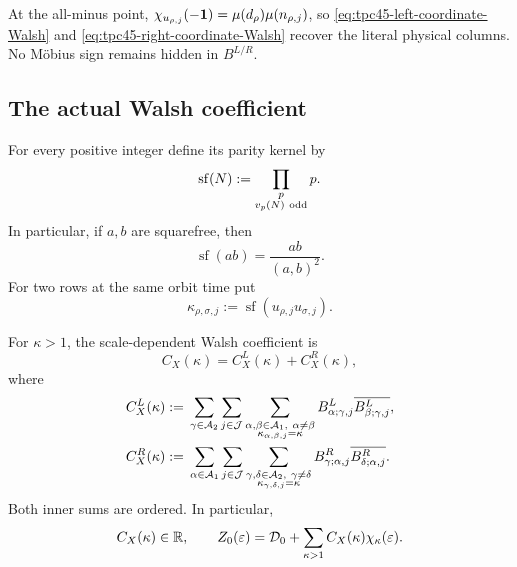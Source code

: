 At the all-minus point,
\(\chi_{u_{\rho,j}}(-\mathbf 1)=\mu(d_\rho)\mu(n_{\rho,j})\), so
\eqref{eq:tpc45-left-coordinate-Walsh} and
\eqref{eq:tpc45-right-coordinate-Walsh} recover the literal physical
columns.  No M\"obius sign remains hidden in \(B^{L/R}\).

\subsection{The actual Walsh coefficient}

For every positive integer define its parity kernel by
\begin{equation}
 \operatorname{sf}(N)
 :=\prod_{\substack{p\\v_p(N)\ {\rm odd}}}p.
 \label{eq:tpc45-sf-definition}
\end{equation}
In particular, if \(a,b\) are squarefree, then
\begin{equation}
 \operatorname{sf}(ab)=\frac{ab}{(a,b)^2}.
 \label{eq:tpc45-sf-two-squarefree}
\end{equation}
For two rows at the same orbit time put
\begin{equation}
 \kappa_{\rho,\sigma,j}
 :=\operatorname{sf}(u_{\rho,j}u_{\sigma,j}).
 \label{eq:tpc45-pair-kernel}
\end{equation}

\begin{proposition}
\label{prop:tpc45-C-original-variables}
For \(\kappa>1\), the scale-dependent Walsh coefficient is
\begin{equation}
 C_X(\kappa)=C_X^L(\kappa)+C_X^R(\kappa),
 \label{eq:tpc45-C-sides}
\end{equation}
where
\begin{align}
 C_X^L(\kappa)
 &:={}
 \sum_{\gamma\in\mathcal A_2}\sum_{j\in\mathcal J}
 \sum_{\substack{\alpha,\beta\in\mathcal A_1,\ \alpha\ne\beta\\
                   \kappa_{\alpha,\beta,j}=\kappa}}
 B^L_{\alpha;\gamma,j}
 \overline{B^L_{\beta;\gamma,j}},
 \label{eq:tpc45-C-left}\\
 C_X^R(\kappa)
 &:={}
 \sum_{\alpha\in\mathcal A_1}\sum_{j\in\mathcal J}
 \sum_{\substack{\gamma,\delta\in\mathcal A_2,\ \gamma\ne\delta\\
                   \kappa_{\gamma,\delta,j}=\kappa}}
 B^R_{\gamma;\alpha,j}
 \overline{B^R_{\delta;\alpha,j}}.
 \label{eq:tpc45-C-right}
\end{align}
Both inner sums are ordered.  In particular,
\begin{equation}
 C_X(\kappa)\in\mathbb R,
 \qquad
 Z_0(\varepsilon)
 =\mathcal D_0+\sum_{\kappa>1}C_X(\kappa)\chi_\kappa(\varepsilon).
 \label{eq:tpc45-C-real-expansion}
\end{equation}
\end{proposition}

